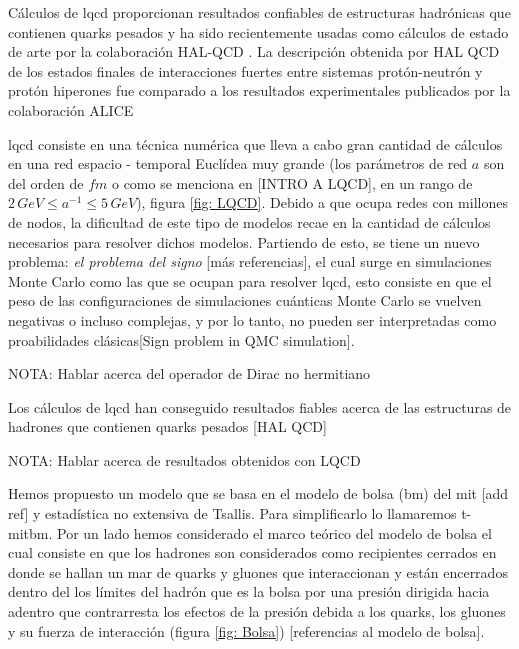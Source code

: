 Cálculos de \acrshort{lqcd} proporcionan resultados confiables de estructuras hadrónicas que contienen quarks pesados y ha sido recientemente usadas como cálculos de estado de arte por la colaboración HAL-QCD \cite{Iritani_2019,Hatsuda_2017}. La descripción obtenida por HAL QCD de los estados finales de interacciones fuertes entre sistemas protón-neutrón y protón hiperones fue comparado a los resultados experimentales publicados por la colaboración ALICE \cite{Collaboration2020, Collaboration2021}

\acrshort{lqcd} consiste en una técnica numérica que lleva a cabo gran cantidad de cálculos en una red espacio - temporal Euclídea muy grande (los parámetros de red $a$ son del orden de $\mathit{fm}$ o como se menciona en [INTRO A LQCD], en un rango de $2 \, \mathit{GeV} \leq {a}^{-1} \leq 5 \, GeV$), figura \ref{fig: LQCD}. Debido a que ocupa redes con millones de nodos, la dificultad de este tipo de modelos recae en la cantidad de cálculos necesarios para resolver dichos modelos. Partiendo de esto, se tiene un nuevo problema: \emph{el problema del signo} [más referencias], el cual surge en simulaciones Monte Carlo como las que se ocupan para resolver \acrshort{lqcd}, esto consiste en que el peso de las configuraciones de simulaciones cuánticas Monte Carlo se vuelven negativas o incluso complejas, y por lo tanto, no pueden ser interpretadas como proabilidades clásicas[Sign problem in QMC simulation]. 

NOTA: Hablar acerca del operador de Dirac no hermitiano

Los cálculos de \acrshort{lqcd} han conseguido resultados fiables acerca de las estructuras de hadrones que contienen quarks pesados [HAL QCD]


NOTA: Hablar acerca de resultados obtenidos con LQCD

Hemos propuesto un modelo que se basa en el modelo de bolsa (\acrshort{bm}) del \acrfull{mit} [add ref] y estadística no extensiva de Tsallis. Para simplificarlo lo llamaremos \acrshort{t-mitbm}. Por un lado hemos considerado el marco teórico del modelo de bolsa el cual consiste en que los hadrones son considerados como recipientes cerrados en donde se hallan un mar de quarks y gluones que interaccionan y están encerrados dentro del los límites del hadrón que es la bolsa por una presión dirigida hacia adentro que contrarresta los efectos de la presión debida a los quarks, los gluones y su fuerza de interacción (figura \ref{fig: Bolsa}) [referencias al modelo de bolsa]. 

